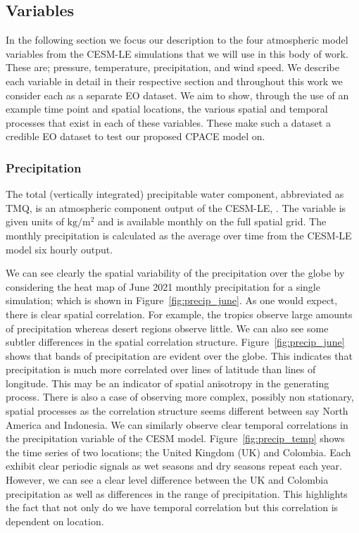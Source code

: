  \subsection{Variables \label{ssec:variables}}
 In the following section we focus our description to the four atmospheric model variables from the  CESM-LE simulations that we will use in this body of work.
 These are; pressure, temperature, precipitation, and wind speed.
 We describe each variable in detail in their respective section and throughout this work we consider each as a separate EO dataset.
 We aim to show, through the use of an example time point and spatial locations, the various spatial and temporal processes that exist in each of these variables.
 These make such a dataset a credible EO dataset to test our proposed CPACE model on. 

\subsubsection{Precipitation \label{sssec:precip}}
The total (vertically integrated) precipitable water component, abbreviated as TMQ, is an atmospheric component output of the CESM-LE, \citep{kay_community_2015}.
The variable is given units of $\si{\kilogram\per\metre\squared} $ and is available monthly on the full spatial grid.
The monthly precipitation is calculated as the average over time from the  CESM-LE model six hourly output. 

We can see clearly the spatial variability of the precipitation over the globe by considering the heat map of June 2021 monthly precipitation for a single simulation; which is shown in Figure~\ref{fig:precip_june}. 
As one would expect, there is clear spatial correlation.
For example, the tropics observe large amounts of precipitation whereas desert regions observe little. 
We can also see some subtler differences in the spatial correlation structure. 
Figure~\ref{fig:precip_june} shows that bands of precipitation are evident over the globe.
This indicates that precipitation is much more correlated over lines of latitude than lines of longitude. 
This may be an indicator of spatial anisotropy in the generating process.
There is also a case of observing more complex, possibly non stationary, spatial processes as the correlation structure seems different between say North America and Indonesia. 
We can similarly observe clear temporal correlations in the precipitation variable of the CESM model.
Figure~\ref{fig:precip_temp} shows the time series of two locations; the United Kingdom (UK) and Colombia.
Each exhibit clear periodic signals as wet seasons and dry seasons repeat each year.
However, we can see a clear level difference between the UK and Colombia precipitation as well as differences in the range of precipitation.
This highlights the fact that not only do we have temporal correlation but this correlation is dependent on location. 

